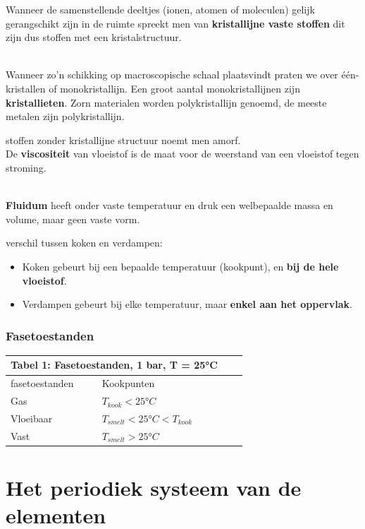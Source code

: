 \documentclass{report}
\begin{document}
Wanneer de samenstellende deeltjes (ionen, atomen of moleculen) gelijk gerangschikt zijn in de ruimte spreekt men van \textbf{kristallijne vaste stoffen} dit zijn dus stoffen met een kristalstructuur.

\\ Wanneer zo'n schikking op macroscopische schaal plaatsvindt praten we over één-kristallen of monokristallijn.
Een groot aantal monokristallijnen zijn \textbf{kristallieten}. Zorn materialen worden polykristallijn genoemd, de meeste metalen zijn polykristallijn.

stoffen zonder kristallijne structuur noemt men amorf.
\\ De \textbf{viscositeit} van vloeistof is de maat voor de weerstand van een vloeistof tegen stroming.

\\ \textbf{Fluidum} heeft onder vaste temperatuur en druk een welbepaalde massa en volume, maar geen vaste vorm.

verschil tussen koken en verdampen:
\begin{itemize}
	\item Koken gebeurt bij een bepaalde temperatuur (kookpunt), en \textbf{bij de hele vloeistof}.
	\item Verdampen gebeurt bij elke temperatuur, maar \textbf{enkel aan het oppervlak}.
\end{itemize}


\subsubsection{Fasetoestanden}%
\label{ssub:Fasetoestanden}

\begin{tabular}{ |p{3cm}||p{4cm}|p{3cm}|p{3cm}|  }
\hline
\multicolumn{2}{|c|}{Tabel 1: Fasetoestanden, 1 bar, T = 25°C} \\
\hline
fasetoestanden& Kookpunten\\
\hline
Gas   & $T_{kook} < 25°C$   \\
Vloeibaar& $T_{smelt} < 25 °C < T_{kook} $    \\
Vast & $T_{smelt} > 25 °C $\\
\hline
\end{tabular}

\section{Het periodiek systeem van de elementen}
\end{document}
